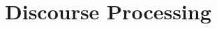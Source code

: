 \documentclass[11pt, a4paper]{article}
\begin{document}



\section{Discourse Processing}
\end{document}
